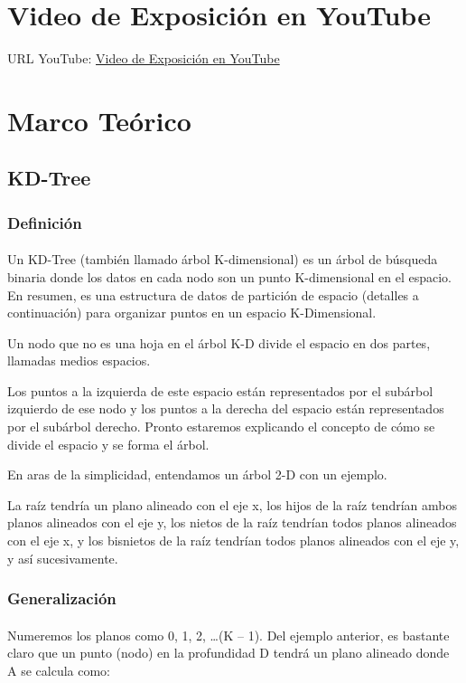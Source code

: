 \documentclass{article}
\begin{document}
\section{Video de Exposición en YouTube}
URL YouTube: \href{https://youtube.com}{Video de Exposición en YouTube}

\clearpage
\section{Marco Teórico}
\subsection{KD-Tree}

\subsubsection{Definición}
\paragraph{}
Un KD-Tree (también llamado árbol K-dimensional) es un árbol de búsqueda binaria donde los datos en cada nodo son un punto K-dimensional en el espacio. En resumen, es una estructura de datos de partición de espacio (detalles a continuación) para organizar puntos en un espacio K-Dimensional.

Un nodo que no es una hoja en el árbol K-D divide el espacio en dos partes, llamadas medios espacios.

Los puntos a la izquierda de este espacio están representados por el subárbol izquierdo de ese nodo y los puntos a la derecha del espacio están representados por el subárbol derecho. Pronto estaremos explicando el concepto de cómo se divide el espacio y se forma el árbol.

En aras de la simplicidad, entendamos un árbol 2-D con un ejemplo.

La raíz tendría un plano alineado con el eje x, los hijos de la raíz tendrían ambos planos alineados con el eje y, los nietos de la raíz tendrían todos planos alineados con el eje x, y los bisnietos de la raíz tendrían todos planos alineados con el eje y, y así sucesivamente.

\subsubsection{Generalización}
\paragraph{}
Numeremos los planos como 0, 1, 2, …(K – 1). Del ejemplo anterior, es bastante claro que un punto (nodo) en la profundidad D tendrá un plano alineado donde A se calcula como:
\end{document}
